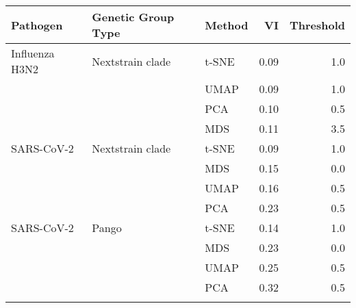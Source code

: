 \begin{tabular}{lllrr}
\toprule
      Pathogen & Genetic Group Type &  Method &   VI &  Threshold \\
\midrule
Influenza H3N2 &   Nextstrain clade &  t-SNE & 0.09 &        1.0 \\
               &                    &   UMAP & 0.09 &        1.0 \\
               &                    &    PCA & 0.10 &        0.5 \\
               &                    &    MDS & 0.11 &        3.5 \\
    SARS-CoV-2 &   Nextstrain clade &  t-SNE & 0.09 &        1.0 \\
               &                    &    MDS & 0.15 &        0.0 \\
               &                    &   UMAP & 0.16 &        0.5 \\
               &                    &    PCA & 0.23 &        0.5 \\
    SARS-CoV-2 &              Pango &  t-SNE & 0.14 &        1.0 \\
               &                    &    MDS & 0.23 &        0.0 \\
               &                    &   UMAP & 0.25 &        0.5 \\
               &                    &    PCA & 0.32 &        0.5 \\
\botrule
\end{tabular}
